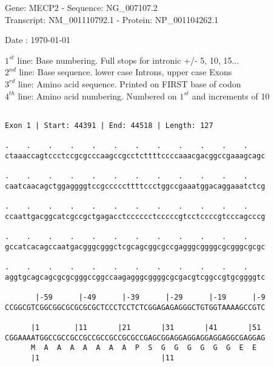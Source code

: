 \documentclass{article}
\begin{document}
\begin{center}
\begin{large}
Gene: MECP2 - Sequence: NG\_007107.2\\
Transcript: NM\_001110792.1 - Protein: NP\_001104262.1
 
 Date : \today
\end{large}
\end{center}
$1^{st}$ line: Base numbering. Full stops for intronic +/- 5, 10, 15...\\
$2^{nd}$ line: Base sequence. lower case Introns, upper case Exons\\
$3^{rd}$ line: Amino acid sequence. Printed on FIRST base of codon\\
$4^{th}$ line: Amino acid numbering. Numbered on $1^{st}$ and increments of 10\\
 \begin{Verbatim}
 
Exon 1 | Start: 44391 | End: 44518 | Length: 127
 
.    .    .    .    .    .    .    .    .    .    .    .    
ctaaaccagtccctccgcgcccaagccgcctcttttccccaaacgacggccgaaagcagc
                                                            
.    .    .    .    .    .    .    .    .    .    .    .    
caatcaacagctggaggggtccgcccccttttccctggccgaaatggacaggaaatctcg
                                                            
.    .    .    .    .    .    .    .    .    .    .    .    
ccaattgacggcatcgccgctgagacctcccccctcccccgtcctccccgtcccagcccg
                                                            
.    .    .    .    .    .    .    .    .    .    .    .    
gccatcacagccaatgacgggcgggctcgcagcggcgccgagggcggggcgcgggcgcgc
                                                            
.    .    .    .    .    .    .    .    .    .    .    .    
aggtgcagcagcgcgcgggccggccaagagggcggggcgcgacgtcggccgtgcggggtc
                                                            
       |-59      |-49      |-39      |-29      |-19      |-9
CCGGCGTCGGCGGCGCGCGCGCTCCCTCCTCTCGGAGAGAGGGCTGTGGTAAAAGCCGTC
                                                            
      |1        |11       |21       |31       |41       |51 
CGGAAAATGGCCGCCGCCGCCGCCGCCGCGCCGAGCGGAGGAGGAGGAGGAGGCGAGGAG
      M  A  A  A  A  A  A  A  P  S  G  G  G  G  G  G  E  E  
      |1                            |11                     
  

\end{Verbatim}
\end{document}
